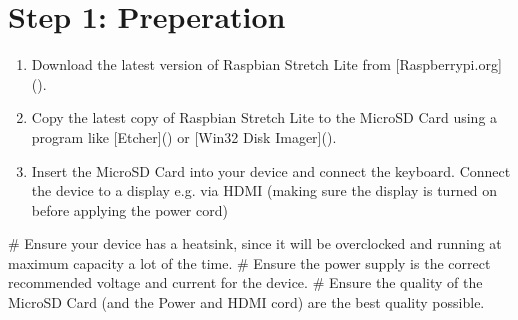 \documentclass[letterpaper,10pt,openany,oneside,english]{sphinxmanual}
\begin{document}
\section{Step 1: Preperation}
\label{\detokenize{manual_build:step-1-preperation}}\begin{enumerate}
\item {} 
Download the latest version of Raspbian Stretch Lite from {[}Raspberrypi.org{]}().

\item {} 
Copy the latest copy of Raspbian Stretch Lite to the MicroSD Card using a program like {[}Etcher{]}() or {[}Win32 Disk Imager{]}().

\item {} 
Insert the MicroSD Card into your device and connect the keyboard. Connect the device to a display e.g. via HDMI (making sure the display is turned on before applying the power cord)

\end{enumerate}

\# Ensure your device has a heatsink, since it will be overclocked and running at maximum capacity a lot of the time.
\# Ensure the power supply is the correct recommended voltage and current for the device.
\# Ensure the quality of the MicroSD Card (and the Power and HDMI cord) are the best quality possible.
\end{document}
